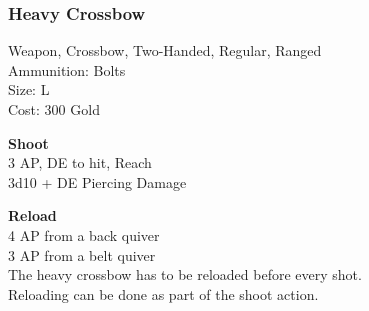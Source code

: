 \subsubsection{Heavy Crossbow}\label{weapon:heavyCrossbow}
Weapon, Crossbow, Two-Handed, Regular, Ranged\\
Ammunition: Bolts\\
Size: L\\
Cost: 300 Gold

\textbf{Shoot} \\
3 AP, DE to hit,  Reach\\
3d10 + \texttimes DE Piercing Damage

\textbf{Reload} \\
4 AP from a back quiver\\
3 AP from a belt quiver\\
The heavy crossbow has to be reloaded before every shot.\\
Reloading can be done as part of the shoot action.

